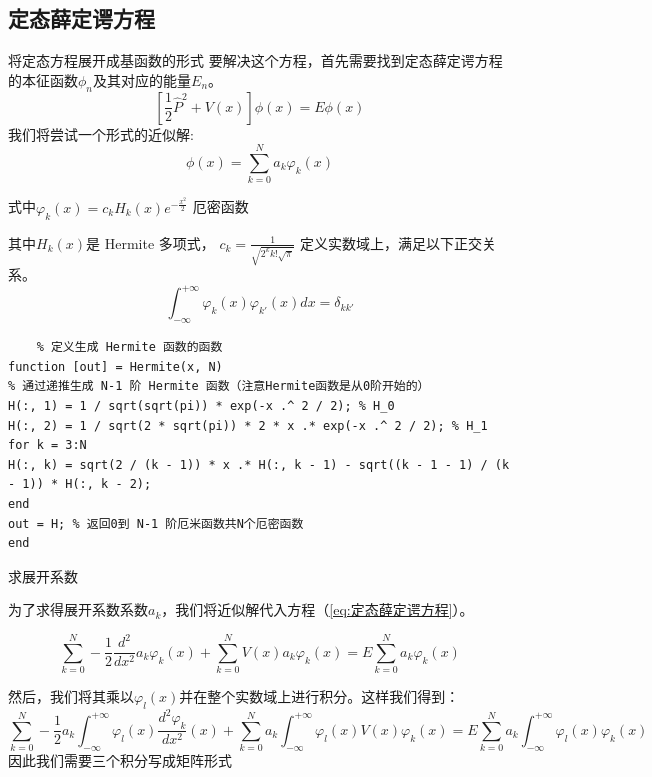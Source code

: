 \documentclass[aspectratio=169]{beamer}
\begin{document}
\subsection{定态薛定谔方程}
\begin{frame}{将定态方程展开成基函数的形式}
要解决这个方程，首先需要找到定态薛定谔方程的本征函数$\phi_n$及其对应的能量$E_n$。
\begin{equation}
    \left[\dfrac{1}{2}\hat{P}^2+V(x)\right]\phi(x)=E\phi(x)
\label{eq:定态薛定谔方程}
\end{equation}
\pause
我们将尝试一个形式的近似解:
\begin{equation}\phi(x)=\sum_{k=0}^Na_k\varphi_k(x)
    \label{eq:定态薛定谔方程近似解}
\end{equation}
    
式中$\varphi_k(x)=c_kH_k(x)e^{-\frac{x^2}2}$ 厄密函数

其中$H_k(x)$是 Hermite 多项式，
$c_k=\frac{1}{\sqrt{2^kk!\sqrt
\pi}}$
\pause
定义实数域上，满足以下正交关系。
\begin{equation}
         \int_{-\infty}^{+\infty}\varphi_k(x)\varphi_{k'}(x)dx=\delta_{kk'}
\label{eq:正交性关系}
        \end{equation}
\end{frame}
\begin{lstlisting}
    % 定义生成 Hermite 函数的函数
function [out] = Hermite(x, N)
% 通过递推生成 N-1 阶 Hermite 函数（注意Hermite函数是从0阶开始的）
H(:, 1) = 1 / sqrt(sqrt(pi)) * exp(-x .^ 2 / 2); % H_0
H(:, 2) = 1 / sqrt(2 * sqrt(pi)) * 2 * x .* exp(-x .^ 2 / 2); % H_1
for k = 3:N
H(:, k) = sqrt(2 / (k - 1)) * x .* H(:, k - 1) - sqrt((k - 1 - 1) / (k - 1)) * H(:, k - 2);
end
out = H; % 返回0到 N-1 阶厄米函数共N个厄密函数
end
\end{lstlisting}
\begin{frame}{求展开系数}

    为了求得展开系数系数$a_k$，我们将近似解代入方程（\ref{eq:定态薛定谔方程}）。


    \begin{equation}
       \sum_{k=0}^{N}-\frac{1}{2}\frac{d^{2}}{dx^{2}}a_{k}\varphi_{k}(x)+\sum_{k=0}^{N}V(x)a_{k}\varphi_{k}(x)=E\sum_{k=0}^{N}a_{k}\varphi_{k}(x)
   \end{equation}
   
   然后，我们将其乘以$\varphi_l(x)$并在整个实数域上进行积分。这样我们得到：
   \begin{equation}
        \sum_{k=0}^{N}-\frac{1}{2}a_{k}\int_{-\infty}^{+\infty}\varphi_{l}(x)\frac{d^{2}\varphi_{k}}{dx^{2}}(x)+\sum_{k=0}^{N}a_{k}\int_{-\infty}^{+\infty}\varphi_{l}(x)V(x)\varphi_{k}(x)=E\sum_{k=0}^{N}a_{k}\int_{-\infty}^{+\infty}\varphi_{l}(x)\varphi_{k}(x)
   \label{eq:定态薛定谔方程近似解}
       \end{equation}
       \pause
       因此我们需要三个积分写成矩阵形式
\end{frame}
\end{document}
